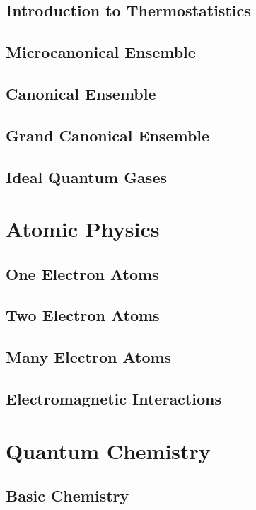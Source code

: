 \documentclass[a4paper, 11pt]{book}
\begin{document}
	\chapter{Introduction to Thermostatistics}
		
	\chapter{Microcanonical Ensemble}
		
	\chapter{Canonical Ensemble}
		
	\chapter{Grand Canonical Ensemble}
		
	\chapter{Ideal Quantum Gases}
		
\part{Atomic Physics}
	\chapter{One Electron Atoms}
		
	\chapter{Two Electron Atoms}
		
	\chapter{Many Electron Atoms}
		
	\chapter{Electromagnetic Interactions}
		
\part{Quantum Chemistry}
	\chapter{Basic Chemistry}
		
\end{document}
